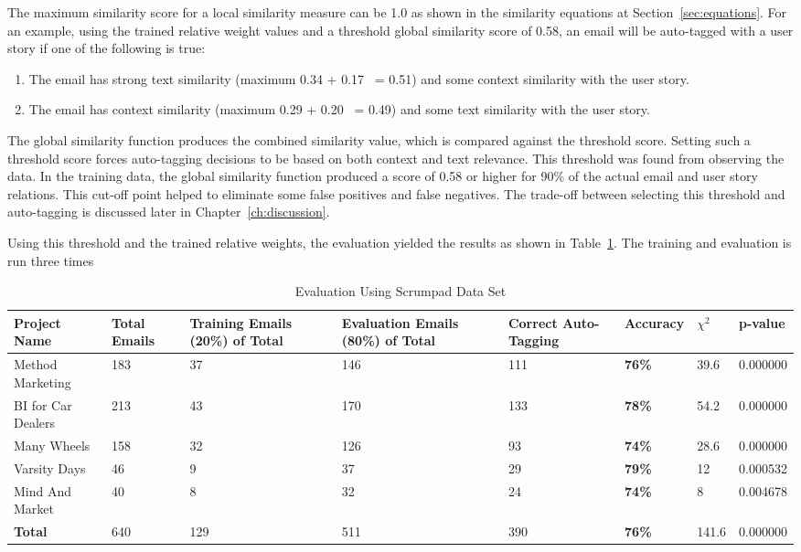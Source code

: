 The maximum similarity score for a local similarity measure can be 1.0 as shown in the similarity equations at Section~\ref{sec:equations}. For an example, using the trained relative weight values and a threshold global similarity score of 0.58, an email will be auto-tagged with a user story if one of the following is true:
\begin{enumerate}
	\item The email has strong text similarity (maximum 0.34 + 0.17 ~= 0.51) and some context similarity with the user story.
	\item The email has context similarity (maximum 0.29 + 0.20 ~= 0.49) and some text similarity with the user story.
\end{enumerate}
The global similarity function produces the combined similarity value, which is compared against the threshold score. Setting such a threshold score forces auto-tagging decisions to be based on both context and text relevance. This threshold was found from observing the data. In the training data, the global similarity function produced a score of 0.58 or higher for 90\% of the actual email and user story relations. This cut-off point helped to eliminate some false positives and false negatives. The trade-off between selecting this threshold and auto-tagging is discussed later in Chapter~\ref{ch:discussion}.  

Using this threshold and the trained relative weights, the evaluation yielded the results as shown in Table~\ref{tab:sp_evaluation}. The training and evaluation is run three times 

\begin{table}[h!]
  \centering
  \caption{Evaluation Using Scrumpad Data Set}
	\label{tab:sp_evaluation}
    \begin{tabular}{|p{1.7cm}|p{1.4cm}|p{2cm}|p{2cm}|p{1.7cm}|p{1.7cm}|p{1cm}|p{1.5cm}|}
      \hline
      \textbf{Project Name} & \textbf{Total Emails} & \textbf{Training Emails (20\%) of Total} & \textbf{Evaluation Emails (80\%)  of Total} & \textbf{Correct Auto-Tagging} & \textbf{Accuracy} & $\chi^{2}$ & p-value\\
      \hline
      Method Marketing & 183 		& 37	& 146	&	111 & \textbf{76\%}	& 39.6	& 0.000000\\
      \hline
      BI for Car Dealers & 213 	& 43	& 170	&	133	& \textbf{78\%}	& 54.2	& 0.000000\\
      \hline
      Many Wheels & 158 				& 32	& 126	& 93	& \textbf{74\%}	& 28.6 	& 0.000000\\
      \hline
      Varsity Days & 46 				& 9		&	37	& 29	& \textbf{79\%}	& 12		& 0.000532\\
      \hline
      Mind And Market & 40 			& 8		& 32	&	24	& \textbf{74\%}	& 8			& 0.004678\\
      \hline
      \textbf{Total} & 640 			& 129	& 511	&	390	& \textbf{76\%}	& 141.6 & 0.000000\\
      \hline
    \end{tabular}
\end{table}

